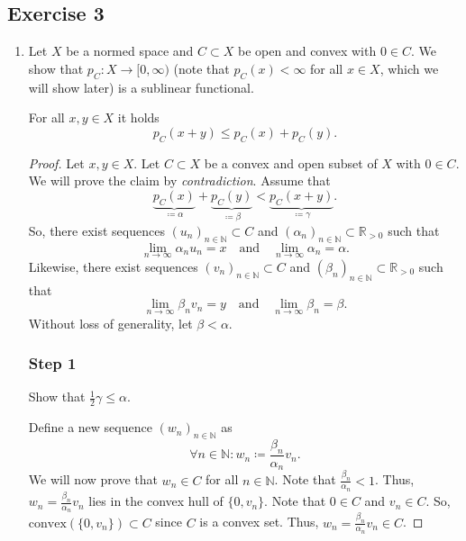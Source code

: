 \documentclass[a4paper]{article}
\begin{document}
\subsection*{Exercise 3}
\begin{enumerate}[label=(\roman*)]
    \item     Let $X$ be a normed space and $C \subset X$ be open and convex with $0 \in C$. We show that $p_C: X \to [0,\infty)$ (note that $p_C(x) < \infty$ for all $x \in X$, which we will show later) is a sublinear functional.
    \begin{issue}{}{}
    For all $x,y \in X$ it holds
    \[
    	p_C(x+y) \leq p_C(x) + p_C(y) .
    \] 
    \end{issue}
    \iffalse
     \begin{proof}
        Let $x,y \in X$. Let $C \subset X$ be a convex and open subset of $X$ with $0 \in C$. We will prove the claim by \emph{contradiction}.
 Assume that $$ \underbrace{p_C(x)}_{\coloneqq \alpha} + \underbrace{p_C(y)}_{\coloneqq \beta} < \underbrace{p_C(x+y)}_{\coloneqq \gamma}.$$ 
        So, there exist sequences $(u_n)_{n \in \mathbb N} \subset C$ and $(\alpha_n)_{n \in \mathbb N} \subset \mathbb R_{> 0}$ such that
        \[
            \lim_{n \to \infty} \alpha_n u_n = x \quad \text{and} \quad \lim_{n \to \infty} \alpha_n = \alpha.
        \]
        Likewise, there exist sequences $(v_n)_{n \in \mathbb N} \subset C$ and $(\beta_n)_{n \in \mathbb N} \subset \mathbb R_{> 0}$ such that
        \[
            \lim_{n \to \infty} \beta_n v_n = y \quad \text{and} \quad \lim_{n \to \infty} \beta_n = \beta.
        \]
        Without loss of generality, let $\beta < \alpha$. 
        
		\subsubsection*{Step 1}    
		
		\begin{goal}{}{}
		Show that $\frac{1}{2}\gamma \leq \alpha$.
		\end{goal}
		    
        Define a new sequence $(w_n)_{n \in \mathbb N}$ as
        \[
            \forall n \in \mathbb N: w_n \coloneqq \frac{\beta_n}{\alpha_n}v_n.
        \]
        We will now prove that $w_n \in C$ for all $n \in \mathbb N$. Note that $\frac{\beta_n}{\alpha_n} < 1$. Thus, $w_n = \frac{\beta_n}{\alpha_n}v_n$ lies in the convex hull of $\{ 0, v_n \}$. Note that $0 \in C$ and $v_n \in C$. So, $\mathrm{convex}(\{ 0, v_n \}) \subset C$ since $C$ is a convex set. Thus, $w_n = \frac{\beta_n}{\alpha_n}v_n \in C$.
        

\end{proof}
\end{enumerate}
\end{document}
